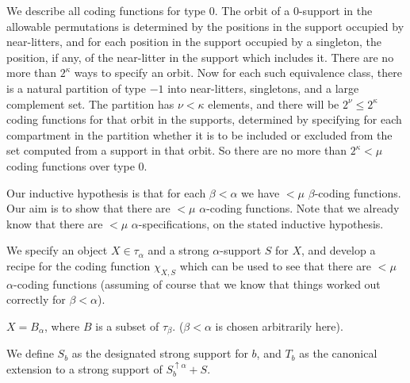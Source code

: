 \documentclass[112pt]{article}
\begin{document}
\begin{description}

\item[Analysis of coding functions for type 0:]  We describe all coding functions for type 0.  The orbit of a 0-support in the allowable permutations is determined by the positions in the support  occupied by near-litters, and for each position in the support occupied by a singleton, the position, if any, of the near-litter in the support  which includes it.  There are no more than $2^\kappa$ ways to specify an orbit.  Now for each such equivalence class, there is a natural partition of type $-1$ into near-litters, singletons, and a large complement set.  The partition has $\nu<\kappa$ elements, and there will be $2^\nu\leq 2^\kappa$ coding functions for that orbit in the supports, determined by specifying for each compartment in the partition whether it is to be included or excluded from the set computed from a support in that orbit.  So there are no more than $2^\kappa<\mu$ coding functions over type 0.

\item[Analysis of the general case:]  

\item
Our inductive hypothesis is that for each $\beta<\alpha$ we have $<\mu$ $\beta$-coding functions.   Our aim is to show that
there are $<\mu$ $\alpha$-coding functions.  Note that we already know that there are $<\mu$ $\alpha$-specifications, on the stated inductive hypothesis.

We specify an object $X\in \tau_\alpha$ and a strong $\alpha$-support $S$ for $X$, and develop a recipe for the coding function $\chi_{X,S}$ which can be used to see that there are $<\mu$ $\alpha$-coding functions (assuming of course that we know that things worked out correctly for $\beta<\alpha$).

$X = B_\alpha$, where $B$ is a subset of $\tau_\beta$.  ($\beta<\alpha$ is chosen arbitrarily here).

We define $S_b$ as the designated strong support for $b$, and $T_b$ as the canonical extension to a strong support of $S_b^{\uparrow \alpha}+S$.




\end{description}
\end{document}
